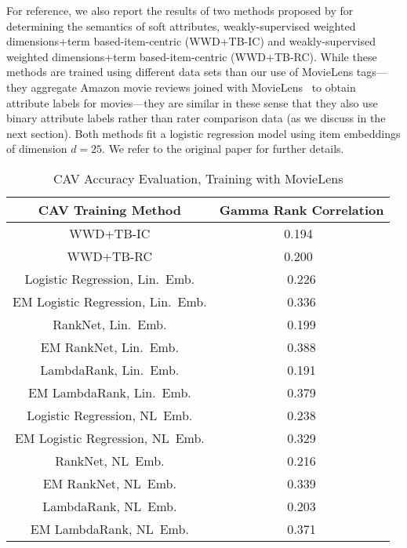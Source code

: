 \documentclass[manuscript,screen,nonacm]{acmart}
\newcommand{\1}{{\mathbf 1}}
\theoremstyle{TheoremNum}
\begin{document}
For reference, we also report the results of two methods proposed by \citet{sigir21:filipandkristian} for determining the semantics of soft attributes, weakly-supervised weighted dimensions+term based-item-centric (WWD+TB-IC) and
weakly-supervised weighted dimensions+term based-item-centric (WWD+TB-RC). While these methods are trained using different data sets than our use of MovieLens tags---they aggregate Amazon movie reviews joined with MovieLens~\cite{docent} to obtain attribute labels for movies---they are similar in these sense that they also use binary attribute labels rather than rater comparison data (as we discuss in the next section). Both methods fit a logistic regression model using item embeddings of dimension $d=25$. We refer to the original paper for further details.

\begin{table}[t]
    \centering
\begin{tabular}{|c||c|}
\hline
CAV Training Method & Gamma Rank Correlation \\ \hline\hline
WWD+TB-IC & 0.194~\cite{sigir21:filipandkristian} \\ \hline     
WWD+TB-RC & 0.200~\cite{sigir21:filipandkristian} \\ \hline
Logistic Regression, Lin.\ Emb. & 0.226 \\ \hline
EM Logistic Regression, Lin.\ Emb. & 0.336 \\ \hline
RankNet, Lin.\ Emb. & 0.199 \\ \hline
EM RankNet, Lin.\ Emb. & 0.388 \\ \hline
LambdaRank, Lin.\ Emb. & 0.191 \\ \hline     
EM LambdaRank, Lin.\ Emb. & 0.379 \\ \hline     
Logistic Regression, NL\ Emb. & 0.238 \\ \hline
EM Logistic Regression, NL\ Emb. & 0.329 \\ \hline
RankNet, NL\ Emb. & 0.216 \\ \hline
EM RankNet, NL\ Emb. & 0.339 \\ \hline
LambdaRank, NL\ Emb. & 0.203 \\ \hline     
EM LambdaRank, NL\ Emb. & 0.371 \\ \hline     
\end{tabular}
\vspace*{2mm}
   \caption{CAV Accuracy Evaluation, Training with MovieLens}
   \label{tab:training_with_movielens_tags}
\end{table}
\end{document}
